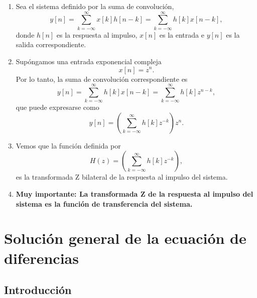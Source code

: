\begin{enumerate}

\item Sea el sistema definido por la suma de convoluci\'{o}n, 
\begin{equation}
        y\left[ n\right] =
                \sum_{k=-\infty }^{\infty }x\left[ k\right] h\left[ n-k\right] =
                \sum_{k=-\infty }^{\infty }h\left[ k\right] x\left[ n-k\right] ,
\end{equation}
donde $h\left[ n\right] $ es la respuesta al impulso, $x\left[ n\right] $ es la entrada e 
$y\left[ n\right] $ es la salida correspondiente.

\item Sup\'{o}ngamos una entrada exponencial compleja 
\begin{equation}
        x\left[ n\right] =z^{n}.
\end{equation}
Por lo tanto, la suma de convoluci\'{o}n correspondiente es 
\begin{equation}
        y\left[ n\right] =
                \sum_{k=-\infty }^{\infty }h\left[ k\right] x\left[ n-k\right] =
                \sum_{k=-\infty }^{\infty }h\left[ k\right] z^{n-k},
\end{equation}
que puede expresarse como 
\begin{equation}
y\left[ n\right] =\left( \sum_{k=-\infty }^{\infty }h\left[ k\right]z^{-k}\right) z^n.
\end{equation}

\item Vemos que la funci\'{o}n definida por
\begin{equation}
        H\left( z\right) =\left( \sum_{k=-\infty }^{\infty }h\left[ k\right]z^{-k}\right),
\end{equation}
es la transformada Z bilateral de la respuesta al impulso del sistema.

\item \textbf{Muy importante: La transformada Z de la respuesta al impulso del sistema es la 
funci\'{o}n de transferencia del sistema.}

\end{enumerate}

\section{Soluci\'{o}n general de la ecuaci\'{o}n de diferencias}

\subsection{Introducci\'{o}n}

